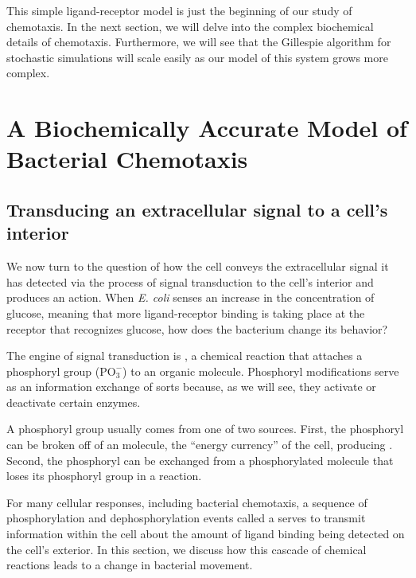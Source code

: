 This simple ligand-receptor model is just the beginning of our study of chemotaxis. In the next section, we will delve into the complex biochemical details of chemotaxis. Furthermore, we will see that the Gillespie algorithm for stochastic simulations will scale easily as our model of this system grows more complex.\\

\FloatBarrier
{}

\section{A Biochemically Accurate Model of Bacterial Chemotaxis}
\label{sec:a_biochemically_accurate_model_of_bacterial_chemotaxis}

\subsection{Transducing an extracellular signal to a cell's interior}

We now turn to the question of how the cell conveys the extracellular signal it has detected via the process of signal transduction to the cell's interior and produces an action. When \textit{E. coli} senses an increase in the concentration of glucose, meaning that more ligand-receptor binding is taking place at the receptor that recognizes glucose, how does the bacterium change its behavior?

The engine of signal transduction is , a chemical reaction that attaches a phosphoryl group ($\text{PO}_3^{-}$) to an organic molecule.  Phosphoryl modifications serve as an information exchange of sorts because, as we will see, they activate or deactivate certain enzymes.

A phosphoryl group usually comes from one of two sources. First, the phosphoryl can be broken off of an  molecule, the ``energy currency'' of the cell, producing . Second, the phosphoryl can be exchanged from a phosphorylated molecule that loses its phosphoryl group in a  reaction.

For many cellular responses, including bacterial chemotaxis, a sequence of phosphorylation and dephosphorylation events called a  serves to transmit information within the cell about the amount of ligand binding being detected on the cell's exterior. In this section, we discuss how this cascade of chemical reactions leads to a change in bacterial movement.

